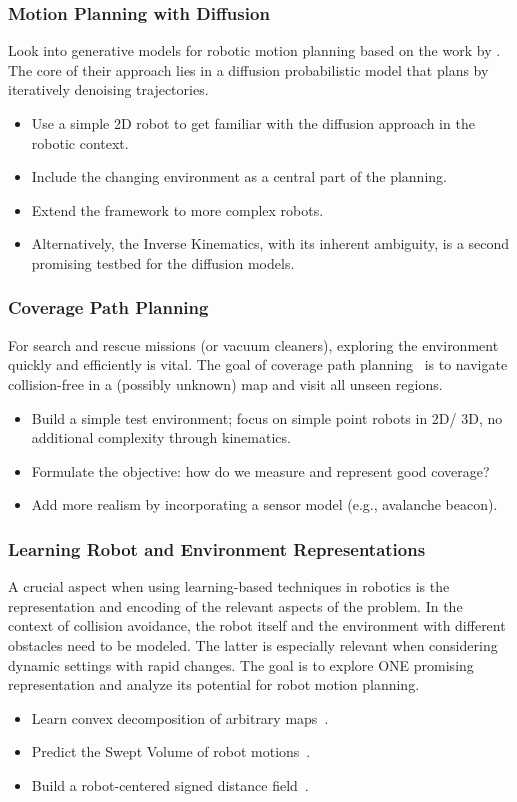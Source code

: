 \documentclass[a4paper]{article}
\begin{document}
\subsubsection{Motion Planning with Diffusion}
Look into generative models for robotic motion planning based on the work by \citet{Janner2022diffusionPlanning}.
The core of their approach lies in a diffusion probabilistic model that plans by iteratively denoising trajectories.
\begin{itemize}
  \item Use a simple 2D robot to get familiar with the diffusion approach in the robotic context.
  \item Include the changing environment as a central part of the planning.
  \item Extend the framework to more complex robots.
  \item Alternatively, the Inverse Kinematics, with its inherent ambiguity, is a second promising testbed for the diffusion models. 
\end{itemize}


\subsubsection{Coverage Path Planning}
For search and rescue missions (or vacuum cleaners), exploring the environment quickly and efficiently is vital. 
The goal of coverage path planning~\cite{Jonnarth2023lcoverage} is to navigate collision-free in a (possibly unknown) map and visit all unseen regions. 
\begin{itemize}
	\item Build a simple test environment; focus on simple point robots in 2D/ 3D, no additional complexity through kinematics.
	\item Formulate the objective: how do we measure and represent good coverage?
	\item Add more realism by incorporating a sensor model (e.g., avalanche beacon). 
\end{itemize}


\subsubsection{Learning Robot and Environment Representations}
    A crucial aspect when using learning-based techniques in robotics is the representation and encoding of the relevant aspects of the problem.
    In the context of collision avoidance, the robot itself and the environment with different obstacles need to be modeled. 
The latter is especially relevant when considering dynamic settings with rapid changes.  
The goal is to explore ONE promising representation and analyze its potential for robot motion planning.
\begin{itemize}
	\item Learn convex decomposition of arbitrary maps~\cite{Deng2020cvxnet}.
	\item Predict the Swept Volume of robot motions~\cite{Baxter2020SweptVolume}.
	\item Build a robot-centered signed distance field~\cite{Liu2023linkSDF}.
\end{itemize}
\end{document}
